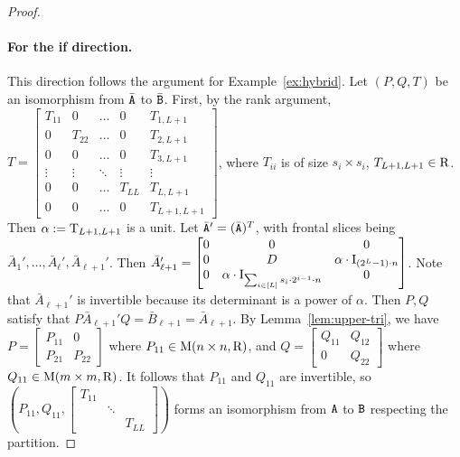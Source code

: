 \begin{proof}
\paragraph{For the if direction.} This direction follows the argument for Example~\ref{ex:hybrid}. Let $(P, Q, T)$ be an isomorphism from $\bar{\mathtt{A}}$ to $\bar{\mathtt{B}}$. First, by the rank argument, $T=\begin{bmatrix}
	T_{11} & 0 & \dots & 0 & T_{1, L+1}\\
	0 & T_{22} & \dots & 0& T_{2, L+1}\\
	0 & 0 & \dots & 0 & T_{3, L+1} \\
	\vdots & \vdots & \ddots & \vdots&\vdots \\
	0 & 0 & \dots  & T_{LL} & T_{L, L+1}\\
	0 & 0 & \dots & 0 & T_{L+1, L+1}
\end{bmatrix}$, where $T_{ii}$ is of size $s_i\times s_i$, $T_{L+1, L+1}\in \mathrm{R}$. Then $\alpha:=\mathrm{T}_{L+1, L+1}$ is a unit. 
Let $\bar{\mathtt{A}}'=(\bar{\mathtt{A}})^T$, with frontal slices being $\bar A_1', \dots, \bar A_\ell', \bar A_{\ell+1}'$. Then $\bar A_{\ell+1}'=\begin{bmatrix}
	0 & 0 & 0 \\
	0 & D & \alpha\cdot \mathrm{I}_{(2^L-1)\cdot n} \\
	0 & \alpha\cdot \mathrm{I}_{\sum_{i\in[L]}s_i\cdot 2^{i-1}\cdot n} & 0
\end{bmatrix}$. Note that $\bar A_{\ell+1}'$ is invertible because its determinant is a power of $\alpha$. Then $P, Q$ satisfy that $P\bar A_{\ell+1}' Q=\bar B_{\ell+1}=\bar A_{\ell+1}$. By Lemma~\ref{lem:upper-tri}, we have $P=\begin{bmatrix}
P_{11} & 0\\
P_{21} & P_{22}
\end{bmatrix}$ where $P_{11}\in\mathrm{M}(n\times n, \mathrm{R})$, and $Q=\begin{bmatrix}
Q_{11} & Q_{12} \\
0 & Q_{22}
\end{bmatrix}$ where $Q_{11}\in\mathrm{M}(m\times m, \mathrm{R})$. It follows that $P_{11}$ and $Q_{11}$ are invertible, so $(P_{11}, Q_{11}, \begin{bmatrix}
T_{11} & & \\
& \ddots & \\
& & T_{LL}
\end{bmatrix}
)$ forms an isomorphism from $\mathtt{A}$ to $\mathtt{B}$ respecting the partition.


\end{proof}
